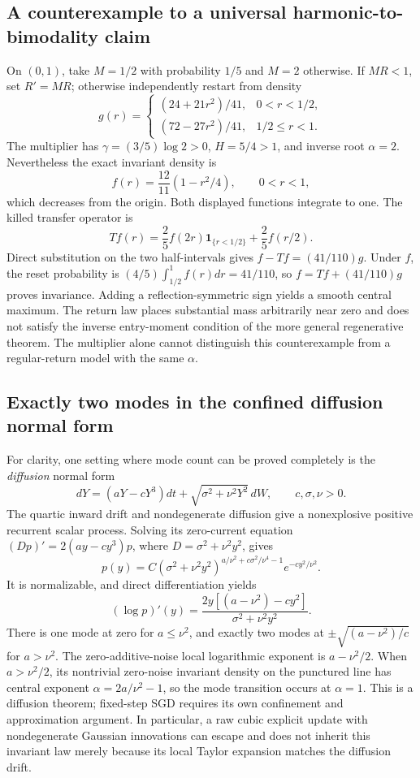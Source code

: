 \subsection{A counterexample to a universal harmonic-to-bimodality claim}
\label{sc:counterexample}
On \((0,1)\), take \(M=1/2\) with probability \(1/5\) and \(M=2\)
otherwise. If \(MR<1\), set \(R'=MR\); otherwise independently restart
from density
\[
 g(r)=\begin{cases}(24+21r^2)/41,&0<r<1/2,\\
                   (72-27r^2)/41,&1/2\le r<1.
       \end{cases}
\]
The multiplier has \(\gamma=(3/5)\log2>0\), \(H=5/4>1\), and inverse
root \(\alpha=2\). Nevertheless the exact invariant density is
\[
 f(r)=\frac{12}{11}(1-r^2/4),\qquad0<r<1,
\]
which decreases from the origin. Both displayed functions integrate to
one. The killed transfer operator is
\[
 Tf(r)=\frac25 f(2r)\mathbf1_{\{r<1/2\}}+\frac25 f(r/2).
\]
Direct substitution on the two half-intervals gives
\(f-Tf=(41/110)g\). Under \(f\), the reset probability is
\((4/5)\int_{1/2}^1f(r)dr=41/110\), so \(f=Tf+(41/110)g\)
proves invariance. Adding a reflection-symmetric sign yields a smooth
central maximum. The return law places substantial mass arbitrarily
near zero and does not satisfy the inverse entry-moment condition of
the more general regenerative theorem. The multiplier alone cannot
distinguish this counterexample from a regular-return model with the
same \(\alpha\).

\subsection{Exactly two modes in the confined diffusion normal form}
For clarity, one setting where mode count can be proved completely is
the \emph{diffusion} normal form
\[
 dY=(aY-cY^3)dt+\sqrt{\sigma^2+\nu^2Y^2}\,dW,
 \qquad c,\sigma,\nu>0.
\]
The quartic inward drift and nondegenerate diffusion give a nonexplosive
positive recurrent scalar process. Solving its zero-current equation
\((Dp)'=2(a y-c y^3)p\), where \(D=\sigma^2+\nu^2y^2\), gives
\[
 p(y)=C(\sigma^2+\nu^2y^2)^{a/\nu^2+c\sigma^2/\nu^4-1}
                e^{-cy^2/\nu^2}.
\]
It is normalizable, and direct differentiation yields
\[
 (\log p)'(y)=\frac{2y[(a-\nu^2)-cy^2]}{\sigma^2+\nu^2y^2}.
\]
There is one mode at zero for \(a\le\nu^2\), and exactly two modes at
\(\pm\sqrt{(a-\nu^2)/c}\) for \(a>\nu^2\).
The zero-additive-noise local logarithmic exponent is
\(a-\nu^2/2\). When $a>\nu^2/2$, its nontrivial zero-noise invariant density on the
punctured line has central exponent \(\alpha=2a/\nu^2-1\), so the mode transition occurs at
\(\alpha=1\). This is a diffusion theorem; fixed-step SGD requires its
own confinement and approximation argument. In particular, a raw cubic
explicit update with nondegenerate Gaussian innovations can escape and
does not inherit this invariant law merely because its local Taylor
expansion matches the diffusion drift.
